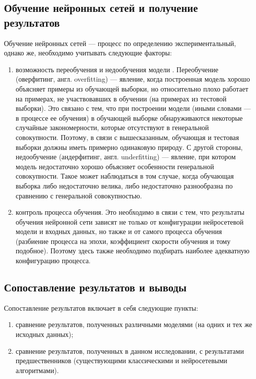 \subsection{Обучение нейронных сетей и получение результатов}
Обучение нейронных сетей --- процесс по определению экспериментальный, однако же, необходимо учитывать следующие факторы:
\begin{enumerate}[1)]
    \item возможность переобучения и недообучения модели \cite{10.1111/j.1751-5823.2011.00149, burnham2003model}. Переобучение (оверфитинг, 
          англ. overfitting) --- явление, когда построенная модель хорошо объясняет примеры из обучающей выборки, но относительно плохо работает 
          на примерах, не участвовавших в обучении (на примерах из тестовой выборки). Это связано с тем, что при построении модели (иными словами --- 
          в процессе ее обучения) в обучающей выборке обнаруживаются некоторые случайные закономерности, которые отсутствуют в генеральной совокупности.
          Поэтому, в связи с вышесказанным, обучающая и тестовая выборки должны иметь примерно одинаковую природу. С другой стороны, недообучение
          (андерфитинг, англ. underfitting) --- явление, при котором модель недостаточно хорошо объясняет особенности генеральной совокупности. Такое
          может наблюдаться в том случае, когда обучающая выборка либо недостаточно велика, либо недостаточно разнообразна по сравнению с генеральной
          совокупностью.
    \item контроль процесса обучения. Это необходимо в связи с тем, что результаты обучения нейронной сети зависят не только от конфигурации 
          нейросетевой модели и входных данных, но также и от самого процесса обучения (разбиение процесса на эпохи, коэффициент скорости обучения
          и тому подобное). Поэтому здесь также необходимо подбирать наиболее адекватную конфигурацию процесса.
\end{enumerate}

\subsection{Сопоставление результатов и выводы}
Сопоставление результатов включает в себя следующие пункты:
\begin{enumerate}[1)]
    \item сравнение результатов, полученных различными моделями (на одних и тех же исходных данных);
    \item сравнение результатов, полученных в данном исследовании, с результатами предшественников (существующими классическими и нейросетевыми алгоритмами).
\end{enumerate}

